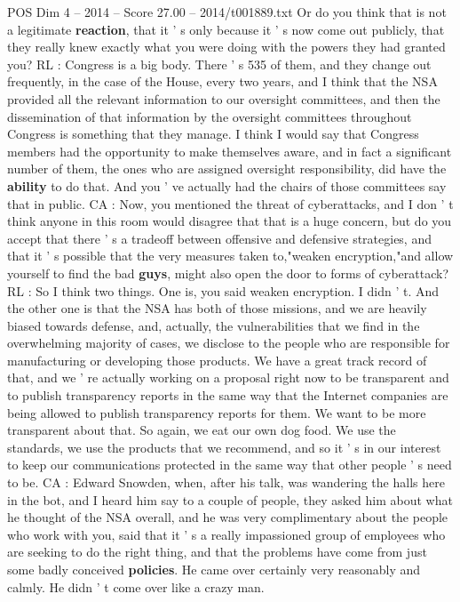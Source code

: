 \begin{textsample}{POS Dim 4 – 2014 – Score 27.00 – 2014/t001889.txt}
Or do you think that is not a legitimate \textbf{reaction}, that it ' s only because it ' s now come out publicly, that they really knew exactly what you were doing with the powers they had granted you?
RL : Congress is a big body.
There ' s 535 of them, and they change out frequently, in the case of the House, every two years, and I think that the NSA provided all the relevant information to our oversight committees, and then the dissemination of that information by the oversight committees throughout Congress is something that they manage.
I think I would say that Congress members had the opportunity to make themselves aware, and in fact a significant number of them, the ones who are assigned oversight responsibility, did have the \textbf{ability} to do that.
And you ' ve actually had the chairs of those committees say that in public.
CA : Now, you mentioned the threat of cyberattacks, and I don ' t think anyone in this room would disagree that that is a huge concern, but do you accept that there ' s a tradeoff between offensive and defensive strategies, and that it ' s possible that the very measures taken to,"weaken encryption,"and allow yourself to find the bad \textbf{guys}, might also open the door to forms of cyberattack?
RL : So I think two things.
One is, you said weaken encryption.
I didn ' t.
And the other one is that the NSA has both of those missions, and we are heavily biased towards defense, and, actually, the vulnerabilities that we find in the overwhelming majority of cases, we disclose to the people who are responsible for manufacturing or developing those products.
We have a great track record of that, and we ' re actually working on a proposal right now to be transparent and to publish transparency reports in the same way that the Internet companies are being allowed to publish transparency reports for them.
We want to be more transparent about that.
So again, we eat our own dog food.
We use the standards, we use the products that we recommend, and so it ' s in our interest to keep our communications protected in the same way that other people ' s need to be.
CA : Edward Snowden, when, after his talk, was wandering the halls here in the bot, and I heard him say to a couple of people, they asked him about what he thought of the NSA overall, and he was very complimentary about the people who work with you, said that it ' s a really impassioned group of employees who are seeking to do the right thing, and that the problems have come from just some badly conceived \textbf{policies}.
He came over certainly very reasonably and calmly.
He didn ' t come over like a crazy man.

\end{textsample}
